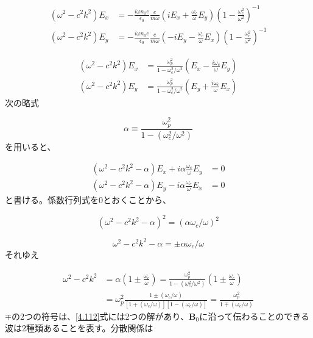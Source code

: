 \documentclass{ltjsarticle}
\numberwithin{equation}{section} %
\begin{document}
\begin{align*}
  (\omega^2 - c^2k^2)E_x &= -\frac{i\omega n_0e}{\epsilon_0}\frac{e}{m\omega}\left(iE_x + \frac{\omega_c}{\omega}E_y\right)\left(1 - \frac{\omega^2_c}{\omega^2}\right)^{-1}\\
  (\omega^2 - c^2k^2)E_y &= -\frac{i\omega n_0e}{\epsilon_0}\frac{e}{m\omega}\left(-iE_y - \frac{\omega_c}{\omega}E_x\right)\left(1 - \frac{\omega^2_c}{\omega^2}\right)^{-1}
\end{align*}

\begin{equation}
  \begin{aligned}
    (\omega^2 - c^2k^2)E_x &= \frac{\omega^2_p}{1 - \omega^2_c/\omega^2}\left(E_x - \frac{i\omega_c}{\omega}E_y\right)\\
    (\omega^2 - c^2k^2)E_y &= \frac{\omega^2_p}{1 - \omega^2_c/\omega^2}\left(E_y + \frac{i\omega_c}{\omega}E_x\right)
  \end{aligned} \label{4.110}
\end{equation}
次の略式

\begin{equation}
  \alpha \equiv \frac{\omega^2_p}{1 - (\omega^2_c/\omega^2)} \label{4.111}
\end{equation}
を用いると、

\begin{equation}
  \begin{aligned}
    (\omega^2 - c^2k^2 - \alpha)E_x + i\alpha\frac{\omega_c}{\omega}E_y &= 0\\
    (\omega^2 - c^2k^2 - \alpha)E_y - i\alpha\frac{\omega_c}{\omega}E_x &= 0
  \end{aligned} \label{4.112}
\end{equation}
と書ける。係数行列式を0とおくことから、

\begin{equation}
  (\omega^2 - c^2k^2 - \alpha)^2 = (\alpha\omega_c/\omega)^2 \label{4.113}
\end{equation}

\begin{equation}
  \omega^2 - c^2k^2 - \alpha = \pm \alpha\omega_c/\omega \label{4.114}
\end{equation}
それゆえ

\begin{align}
  \omega^2 - c^2k^2 &= \alpha\left(1 \pm \frac{\omega_c}{\omega}\right) = \frac{\omega^2_p}{1 - (\omega^2_c/\omega^2)}\left(1 \pm \frac{\omega_c}{\omega}\right) \nonumber \\
                    &= \omega^2_p \frac{1 \pm (\omega_c/\omega)}{[1 + (\omega_c/\omega)][1 - (\omega_c/\omega)]} = \frac{\omega^2_p}{1 \mp (\omega_c/\omega)} \label{4.115}
\end{align} 
$\mp$の2つの符号は、\eqref{4.112}式には2つの解があり、$\bm{B}_0$に沿って伝わることのできる波は2種類あることを表す。分散関係は
\end{document}
